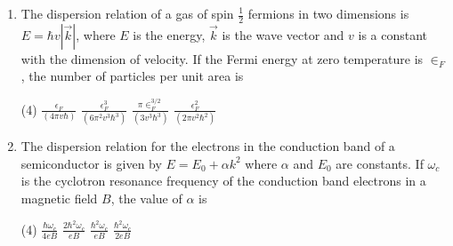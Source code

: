 \begin{enumerate}
	{}
\begin{tasks}(4)
\task[\textbf{A.}] $0.44$
\task[\textbf{B.}]  $1.50$
\task[\textbf{C.}] $0.33$
\task[\textbf{D.}]  $0.66$
\end{tasks}
	\item The dispersion relation of a gas of spin $\frac{1}{2}$ fermions in two dimensions is $E=\hbar v|\vec{k}|$, where $E$ is the energy, $\vec{k}$ is the wave vector and $v$ is a constant with the dimension of velocity. If the Fermi energy at zero temperature is $\in_{F}$, the number of particles per unit area is
	{}
\begin{tasks}(4)
\task[\textbf{A.}] $\frac{\epsilon_{F}}{(4 \pi v \hbar)}$
\task[\textbf{B.}] $\frac{\epsilon_{F}^{3}}{\left(6 \pi^{2} v^{3} \hbar^{3}\right)}$
\task[\textbf{C.}] $\frac{\pi \in_{F}^{3 / 2}}{\left(3 v^{3} \hbar^{3}\right)}$
\task[\textbf{D.}] $\frac{\epsilon_{F}^{2}}{\left(2 \pi v^{2} \hbar^{2}\right)}$
\end{tasks}
	\item The dispersion relation for the electrons in the conduction band of a semiconductor is given by $E=E_{0}+\alpha k^{2}$ where $\alpha$ and $E_{0}$ are constants. If $\omega_{c}$ is the cyclotron resonance frequency of the conduction band electrons in a magnetic field $B$, the value of $\alpha$ is
	{}
\begin{tasks}(4)
\task[\textbf{A.}] $\frac{\hbar \omega_{c}}{4 e B}$
\task[\textbf{B.}] $\frac{2 \hbar^{2} \omega_{c}}{e B}$
\task[\textbf{C.}] $\frac{\hbar^{2} \omega_{c}}{e B}$
\task[\textbf{D.}]  $\frac{\hbar^{2} \omega_{c}}{2 e B}$
\end{tasks}
\end{enumerate}
\setlength\arrayrulewidth{1pt}
